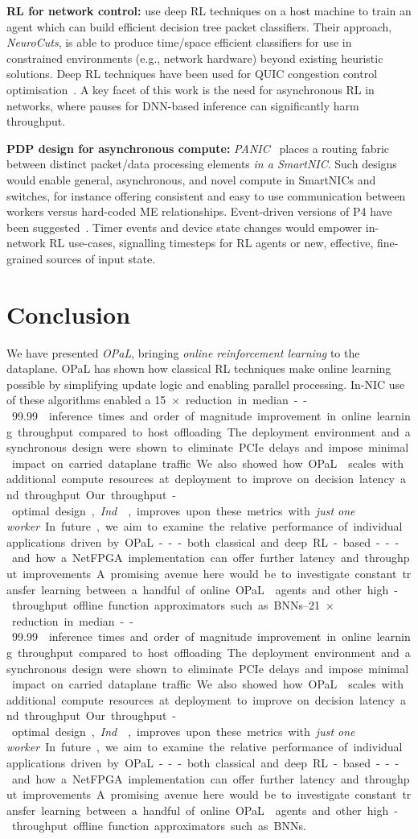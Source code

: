 \documentclass[
sigconf,natbib=false
]{acmart}
\newcommand{\fakepara}[1]{\noindent\textbf{#1:}}
\newcommand{\approachshort}{OPaL}
\newcommand{\Indfw}{\emph{Ind}}
\begin{document}
\fakepara{RL for network control}
\Textcite{DBLP:conf/sigcomm/LiangZJS19} use deep RL techniques on a host machine to train an agent which can build efficient decision tree packet classifiers.
Their approach, \emph{NeuroCuts}, is able to produce time/space efficient classifiers for use in constrained environments (e.g., network hardware) beyond existing heuristic solutions.
Deep RL techniques have been used for QUIC congestion control optimisation~\parencite{DBLP:journals/corr/abs-1910-04054}.
A key facet of this work is the need for asynchronous RL in networks, where pauses for DNN-based inference can significantly harm throughput.

\fakepara{PDP design for asynchronous compute}
\emph{PANIC}~\parencite{DBLP:conf/hotnets/StephensAS18} places a routing fabric between distinct packet/data processing elements \emph{in a SmartNIC}.
Such designs would enable general, asynchronous, and novel compute in SmartNICs and switches, for instance offering consistent and easy to use communication between workers versus hard-coded ME relationships.
Event-driven versions of P4 have been suggested~\parencite{DBLP:conf/hotnets/IbanezABM19}.
Timer events and device state changes would empower in-network RL use-cases, signalling timesteps for RL agents or new, effective, fine-grained sources of input state.

\section{Conclusion}
We have presented \emph{\approachshort{}}, bringing \emph{online reinforcement learning} to the dataplane.
\approachshort{} has shown how classical RL techniques make online learning possible by simplifying update logic and enabling parallel processing.
In-NIC use of these algorithms enabled a \SIrange{15}{21}{$\times$} reduction in median--\num{99.99} inference times and order of magnitude improvement in online learning throughput compared to host offloading.
The deployment environment and asynchronous design were shown to eliminate PCIe delays and impose minimal impact on carried dataplane traffic.
We also showed how \approachshort{} scales with additional compute resources at deployment to improve on decision latency and throughput.
Our throughput-optimal design, \Indfw{}, improves upon these metrics with \emph{just one worker}.

In future, we aim to examine the relative performance of individual applications driven by \approachshort---both classical and deep RL-based---and how a NetFPGA implementation can offer further latency and throughput improvements.
A promising avenue here would be to investigate constant transfer learning between a handful of online \approachshort{} agents and other high-throughput offline function approximators such as BNNs.
\end{document}
